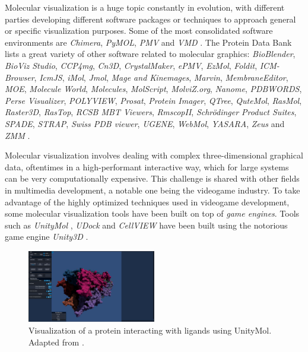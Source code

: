    Molecular visualization is a huge topic constantly in evolution, with different parties developing different software packages or techniques to approach general or specific visualization purposes. Some of the most consolidated software environments are \textit{Chimera}, \textit{PyMOL}, \textit{PMV} and \textit{VMD} \cite{visualization_2018, vmd_96}. The Protein Data Bank lists a great variety of other software related to molecular graphics: \textit{BioBlender}, \textit{BioViz Studio}, \textit{CCP4mg}, \textit{Cn3D}, \textit{CrystalMaker}, \textit{ePMV}, \textit{EzMol}, \textit{Foldit}, \textit{ICM-Browser}, \textit{IcmJS}, \textit{iMol}, \textit{Jmol}, \textit{Mage and Kinemages}, \textit{Marvin}, \textit{MembraneEditor}, \textit{MOE}, \textit{Molecule World}, \textit{Molecules}, \textit{MolScript}, \textit{MolviZ.org}, \textit{Nanome}, \textit{PDBWORDS}, \textit{Perse Visualizer}, \textit{POLYVIEW}, \textit{Prosat}, \textit{Protein Imager}, \textit{QTree}, \textit{QuteMol}, \textit{RasMol}, \textit{Raster3D}, \textit{RasTop}, \textit{RCSB MBT Viewers}, \textit{RmscopII}, \textit{Schrödinger Product Suites}, \textit{SPADE}, \textit{STRAP}, \textit{Swiss PDB viewer}, \textit{UGENE}, \textit{WebMol}, \textit{YASARA}, \textit{Zeus} and \textit{ZMM} \cite{visualization_web}.

    Molecular visualization involves dealing with complex three-dimensional graphical data, oftentimes in a high-performant interactive way, which for large systems can be very computationally expensive. This challenge is shared with other fields in multimedia development, a notable one being the videogame industry. To take advantage of the highly optimized techniques used in videogame development, some molecular visualization tools have been built on top of \textit{game engines}. Tools such as \textit{UnityMol} \cite{unitymol_2015, unitymol_web}, \textit{UDock} and \textit{CellVIEW} have been built using the notorious game engine \textit{Unity3D} \cite{visualization_2018, unity_2014}.

    \begin{figure}[H]
      \centering
      \includegraphics[width=0.5\textwidth]{figures/intro/unitymol.jpg}
      \caption{\label{fig:intro/unitymol} Visualization of a protein interacting with ligands using UnityMol. Adapted from \cite{unitymol_web}.}
    \end{figure}

